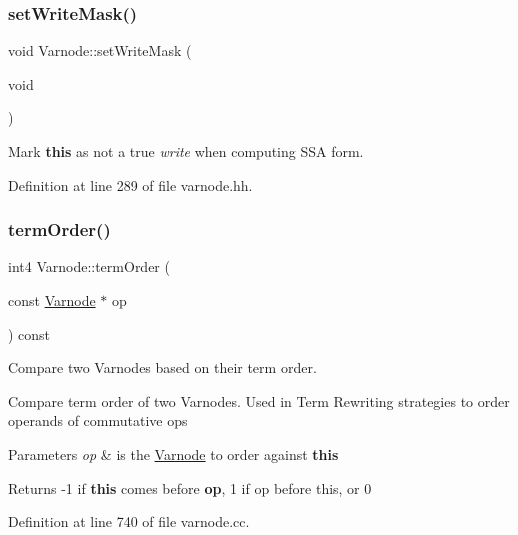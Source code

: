 \subsubsection{\texorpdfstring{setWriteMask()}{setWriteMask()}}
{\footnotesize\ttfamily void Varnode\+::set\+Write\+Mask (\begin{DoxyParamCaption}\item[{void}]{ }\end{DoxyParamCaption})\hspace{0.3cm}{\ttfamily [inline]}}



Mark {\bfseries{this}} as not a true {\itshape write} when computing S\+SA form. 



Definition at line 289 of file varnode.\+hh.

\mbox{\label{class_varnode_a97a1df25894d4457f7442303381fc80a}} 
\subsubsection{\texorpdfstring{termOrder()}{termOrder()}}
{\footnotesize\ttfamily int4 Varnode\+::term\+Order (\begin{DoxyParamCaption}\item[{const \mbox{\hyperlink{class_varnode}{Varnode}} $\ast$}]{op }\end{DoxyParamCaption}) const}



Compare two Varnodes based on their term order. 

Compare term order of two Varnodes. Used in Term Rewriting strategies to order operands of commutative ops 
\begin{DoxyParams}{Parameters}
{\em op} & is the \mbox{\hyperlink{class_varnode}{Varnode}} to order against {\bfseries{this}} \\
\hline
\end{DoxyParams}
\begin{DoxyReturn}{Returns}
-\/1 if {\bfseries{this}} comes before {\bfseries{op}}, 1 if op before this, or 0 
\end{DoxyReturn}


Definition at line 740 of file varnode.\+cc.

\mbox{\label{class_varnode_a48932e5bf8aab53ae9b3a6a6d9b25ce8}} 
